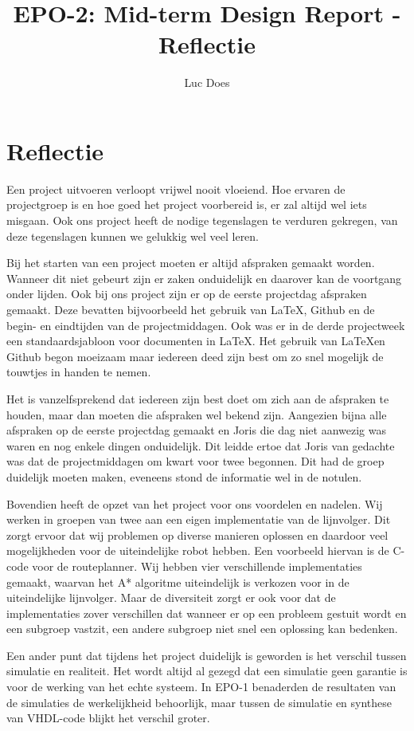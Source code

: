 \documentclass{report}
\title{EPO-2: Mid-term Design Report - Reflectie}
\author{Luc Does}
\begin{document}
\chapter{Reflectie}
\label{ch:reflectie}

Een project uitvoeren verloopt vrijwel nooit vloeiend. Hoe ervaren de projectgroep is en hoe goed het project voorbereid is, er zal altijd wel iets misgaan. Ook ons project heeft de nodige tegenslagen te verduren gekregen, van deze tegenslagen kunnen we gelukkig wel veel leren. \newline

Bij het starten van een project moeten er altijd afspraken gemaakt worden. Wanneer dit niet gebeurt zijn er zaken onduidelijk en daarover kan de voortgang onder lijden. Ook bij ons project zijn er op de eerste projectdag afspraken gemaakt. Deze bevatten bijvoorbeeld het gebruik van \LaTeX, Github en de begin- en eindtijden van de projectmiddagen. Ook was er in de derde projectweek een standaardsjabloon voor documenten in \LaTeX. Het gebruik van \LaTeX en Github begon moeizaam maar iedereen deed zijn best om zo snel mogelijk de touwtjes in handen te nemen. \newline

Het is  vanzelfsprekend dat iedereen zijn best doet om zich aan de afspraken te houden, maar dan moeten die afspraken wel bekend zijn. Aangezien bijna alle afspraken op de eerste projectdag gemaakt en Joris die dag niet aanwezig was waren en nog enkele dingen onduidelijk. Dit leidde ertoe dat Joris van gedachte was dat de projectmiddagen om kwart voor twee begonnen. Dit had de groep duidelijk moeten maken, eveneens stond de informatie wel in de notulen. \newline

Bovendien heeft de opzet van het project voor ons voordelen en nadelen. Wij werken in groepen van twee aan een eigen implementatie van de lijnvolger. Dit zorgt ervoor dat wij problemen op diverse manieren oplossen en daardoor veel mogelijkheden voor de uiteindelijke robot hebben. Een voorbeeld hiervan is de C-code voor de routeplanner. Wij hebben vier verschillende implementaties gemaakt, waarvan het A* algoritme uiteindelijk is verkozen voor in de uiteindelijke lijnvolger. Maar de diversiteit zorgt er ook voor dat de implementaties zover verschillen dat wanneer er op een probleem gestuit wordt en een subgroep vastzit, een andere subgroep niet snel een oplossing kan bedenken. \newline

Een ander punt dat tijdens het project duidelijk is geworden is het verschil tussen simulatie en realiteit. Het wordt altijd al gezegd dat een simulatie geen garantie is voor de werking van het echte systeem. In EPO-1 benaderden de resultaten van de simulaties de werkelijkheid behoorlijk, maar tussen de simulatie en synthese van VHDL-code blijkt het verschil groter. \newline
\end{document}

